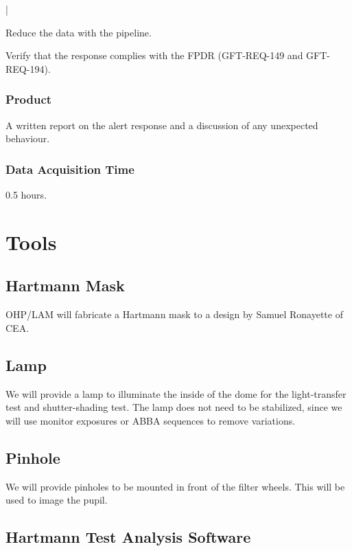 |\documentclass{article}
\begin{document}
Reduce the data with the pipeline.

Verify that the response complies with the FPDR (GFT-REQ-149 and GFT-REQ-194).

\subsubsection{Product}

A written report on the alert response and a discussion of any unexpected behaviour.

\subsubsection{Data Acquisition Time}

0.5 hours.


\section{Tools}
\label{section:tools}

\subsection{Hartmann Mask}

OHP/LAM will fabricate a Hartmann mask to a design by Samuel Ronayette of CEA.

\subsection{Lamp}

We will provide a lamp to illuminate the inside of the dome for the light-transfer test and shutter-shading test. The lamp does not need to be stabilized, since we will use monitor exposures or ABBA sequences to remove variations.

\subsection{Pinhole}

We will provide pinholes to be mounted in front of the filter wheels. This will be used to image the pupil.

\subsection{Hartmann Test Analysis Software}
\end{document}
